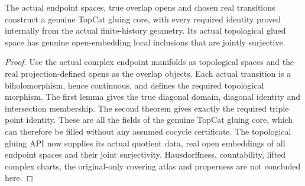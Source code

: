 \begin{theorem}
\label{hir:sharp-actual-endpoint-topcat-glue-core}
\leanok
{}
The actual endpoint spaces, true overlap opens and chosen real transitions
construct a genuine TopCat gluing core, with every required identity proved
internally from the actual finite-history geometry. Its actual topological
glued space has genuine open-embedding local inclusions that are jointly
surjective.
\end{theorem}
\begin{proof}
Use the actual complex endpoint manifolds as topological spaces and the real
projection-defined opens as the overlap objects. Each actual transition is a
biholomorphism, hence continuous, and defines the required topological
morphism. The first lemma gives the true diagonal domain, diagonal identity
and intersection membership. The second theorem gives exactly the required
triple point identity. These are all the fields of the genuine TopCat gluing
core, which can therefore be filled without any assumed cocycle certificate.
The topological gluing API now supplies its actual quotient data, real open
embeddings of all endpoint spaces and their joint surjectivity. Hausdorffness,
countability, lifted complex charts, the original-only covering atlas and
properness are not concluded here.
\end{proof}
